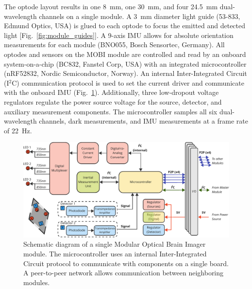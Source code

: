 The optode layout results in one 8~mm, one 30~mm, and four 24.5~mm dual-wavelength channels on a single module. A 3~mm diameter light guide (53-833, Edmund Optics, USA) is glued to each optode to focus the emitted and detected light [Fig.~\ref{fig:module_guides}]. A 9-axis \ac{IMU} allows for absolute orientation measurements for each module (BNO055, Bosch Sensortec, Germany). All optodes and sensors on the \ac{MOBI} module are controlled and read by an onboard system-on-a-chip (BC832, Fanstel Corp, USA) with an integrated microcontroller (nRF52832, Nordic Semiconductor, Norway). An internal Inter-Integrated Circuit (I$^2$C) communication protocol is used to set the current driver and communicate with the onboard \ac{IMU} (Fig.~\ref{fig:architecture_mobi}). Additionally, three low-dropout voltage regulators regulate the power source voltage for the source, detector, and auxiliary measurement components. The microcontroller samples all six dual-wavelength channels, dark measurements, and \ac{IMU} measurements at a frame rate of 22~Hz. 

\begin{figure}
	\begin{center}
	    \includegraphics[width=\textwidth]{fig/mobi/architecture_mobi.pdf}
	\end{center}
	\caption{Schematic diagram of a single Modular Optical Brain Imager module. The microcontroller uses an internal Inter-Integrated Circuit protocol to communicate with components on a single board. A peer-to-peer network allows communication between neighboring modules. } 
	\label{fig:architecture_mobi}
\end{figure} 

